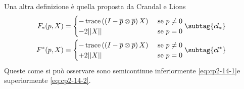 \begin{enumi}
\begin{osservazione}
\begin{itemize}
\end{itemize}
\end{osservazione}
  \item Una altra definizione è quella proposta da Crandal e Lions \cite[vedi][§9]{crand:lion}
\begin{subequations}
\begin{align}
  \label{eq:cp2-14-1}%
  F_*(p,X) &=%
  \begin{cases}
   -\trace\left(\left(I-\overline{p}\otimes\overline{p}\right)X\right) &\text{ se } p\ne 0 \\
   -2||X|| & \text{ se }p = 0
  \end{cases} \subtag{cl_*}\\
  \label{eq:cp2-14-2}%
  F^*(p,X) &=%
  \begin{cases}
   -\trace\left(\left(I-\overline{p}\otimes\overline{p}\right)X\right) &\text{ se } p\ne 0 \\
   +2||X|| & \text{ se }p = 0
  \end{cases} \subtag{cl^*}
\end{align}
\end{subequations}
Queste come si può osservare sono semicontinue inferiormente \eqref{eq:cp2-14-1}e superiormente \eqref{eq:cp2-14-2}.
\end{enumi}



